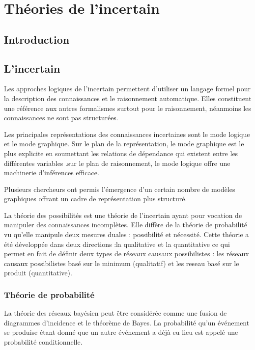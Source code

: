 \chapter{Théories de l'incertain}

{}
\section*{Introduction}
\section{L’incertain}

Les approches logiques de l’incertain permettent d’utiliser un langage formel pour la description des connaissances et le raisonnement automatique. Elles constituent une référence aux autres formalismes surtout pour le raisonnement, néanmoins les connaissances ne  sont pas structurées.

Les principales représentations des connaissances incertaines sont le mode logique et le mode graphique.
Sur le plan de la représentation, le mode graphique est le plus explicite en soumettant les relations de dépendance qui existent entre les différentes variables .sur le plan de raisonnement, le mode logique offre une machinerie d’inférences efficace.

Plusieurs chercheurs ont permis l’émergence d’un certain nombre de modèles graphiques offrant un cadre de représentation plus structuré.

La théorie des possibilités est une théorie de l’incertain ayant pour vocation de manipuler des connaissances incomplètes. Elle diffère de la théorie de probabilité  vu qu'elle manipule deux mesures duales : possibilité et nécessité. Cette théorie a été développée dans deux directions :la qualitative et la quantitative ce qui permet en fait de définir deux types de réseaux causaux possibilistes : les réseaux causaux possibilistes basé sur le minimum (qualitatif) et les reseau basé sur le produit (quantitative).
\subsection{Théorie de probabilité}

La théorie des réseaux bayésien peut être considérée comme une fusion de diagrammes d'incidence et le théorème de Bayes. La probabilité qu'un événement se produise étant donné que un autre événement a déjà eu lieu est appelé une probabilité conditionnelle. 

